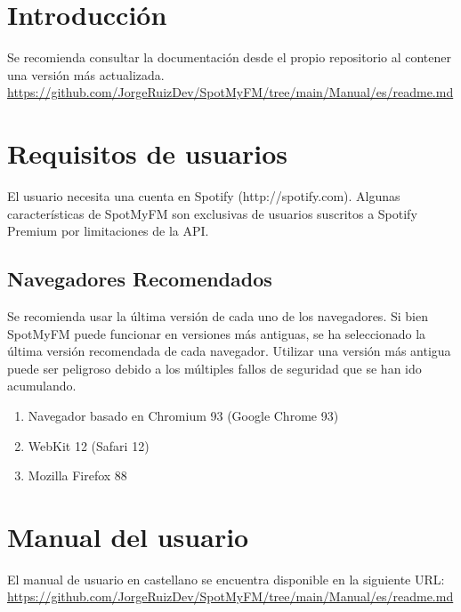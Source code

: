 
\section{Introducción}

Se recomienda consultar la documentación desde el propio repositorio al contener una versión más actualizada.\\
\href{https://github.com/JorgeRuizDev/SpotMyFM/tree/main/Manual/es/readme.md}{https://github.com/JorgeRuizDev/SpotMyFM/tree/main/Manual/es/readme.md}


\section{Requisitos de usuarios}
El usuario necesita una cuenta en Spotify (http://spotify.com).
Algunas características de SpotMyFM son exclusivas de usuarios suscritos a Spotify Premium por limitaciones de la API.

\subsection{Navegadores Recomendados}
Se recomienda usar la última versión de cada uno de los navegadores. Si bien SpotMyFM puede funcionar en versiones más antiguas, se ha seleccionado la última versión recomendada de cada navegador. Utilizar una versión más antigua puede ser peligroso debido a los múltiples fallos de seguridad que se han ido acumulando.

\begin{enumerate}
    \item Navegador basado en Chromium 93 (Google Chrome 93)
    \item WebKit 12 (Safari 12) 
    \item Mozilla Firefox 88
\end{enumerate}

\section{Manual del usuario}
El manual de usuario en castellano se encuentra disponible en la siguiente URL: 
\href{https://github.com/JorgeRuizDev/SpotMyFM/tree/main/Manual/es/readme.md}{https://github.com/JorgeRuizDev/SpotMyFM/tree/main/Manual/es/readme.md}